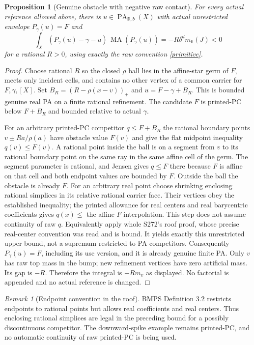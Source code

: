 \documentclass[11pt]{article}
\newtheorem{proposition}[theorem]{Proposition}
\theoremstyle{definition}\newtheorem{definition}[theorem]{Definition}
\theoremstyle{remark}\newtheorem{remark}[theorem]{Remark}
\newcommand{\R}{\mathbb R}\newcommand{\Q}{\mathbb Q}
\newcommand{\PA}{\operatorname{PA}}\newcommand{\PC}{\operatorname{PC}}
\newcommand{\MA}{\operatorname{MA}}\newcommand{\relint}{\operatorname{relint}}
\begin{document}
\begin{proposition}[Genuine obstacle with negative raw contact]\label{contact}
For every actual reference allowed above, there is $u\in\PA_{\R,b}(X)$ with actual unrestricted envelope $P_\gamma(u)=F$ and
\[
\int_X(P_\gamma(u)-\gamma-u)\,\MA(P_\gamma(u))=-R\delta^d m_0(J)<0
\]
for a rational $R>0$, using exactly the raw convention \eqref{primitive}.
\end{proposition}
\begin{proof}
Choose rational $R$ so the closed $\rho$ ball lies in the affine-star germ of $F$, meets only incident cells, and contains no other vertex of a common carrier for $F,\gamma,[X]$. Set
$B_R=(R-\rho(x-v))_+$ and $u=F-\gamma+B_R$. This is bounded genuine real PA on a finite rational refinement. The candidate $F$ is printed-PC below $F+B_R$ and bounded relative to actual $\gamma$.

For an arbitrary printed-PC competitor $q\leq F+B_R$ the rational boundary points $v\pm Ra/\rho(a)$ have obstacle value $F(v)$ and give the flat midpoint inequality $q(v)\leq F(v)$. A rational point inside the ball is on a segment from $v$ to its rational boundary point on the same ray in the same affine cell of the germ. The segment parameter is rational, and Jensen gives $q\leq F$ there because $F$ is affine on that cell and both endpoint values are bounded by $F$. Outside the ball the obstacle is already $F$. For an arbitrary real point choose shrinking enclosing rational simplices in its relative rational carrier face. Their vertices obey the established inequality; the printed allowance for real centers and real barycentric coefficients gives $q(x)\leq$ the affine $F$ interpolation. This step does not assume continuity of raw $q$. Equivalently apply whole S272's roof proof, whose precise real-center convention was read and is bound. It yields exactly this unrestricted upper bound, not a supremum restricted to PA competitors. Consequently $P_\gamma(u)=F$, including its usc version, and it is already genuine finite PA. Only $v$ has raw top mass in the bump; new refinement vertices have zero artificial mass. Its gap is $-R$. Therefore the integral is $-Rm_v$ as displayed. No factorial is appended and no actual reference is changed.
\end{proof}

\begin{remark}[Endpoint convention in the roof]
BMPS Definition 3.2 restricts endpoints to rational points but allows real coefficients and real centers. Thus enclosing rational simplices are legal in the preceding bound for a possibly discontinuous competitor. The downward-spike example remains printed-PC, and no automatic continuity of raw printed-PC is being used.
\end{remark}
\end{document}
